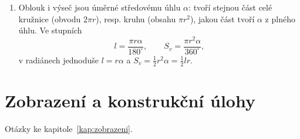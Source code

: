 \begin{enumerate}[label=\textbf{\arabic*.}, leftmargin=*, itemsep=0.8em]
  \item {}
  Oblouk i výseč jsou úměrné středovému úhlu $\alpha$: tvoří stejnou část celé kružnice (obvodu $2\pi r$), resp. kruhu (obsahu $\pi r^2$), jakou část tvoří $\alpha$ z plného úhlu. Ve stupních
  \begin{equation*}
    l = \frac{\pi r\alpha}{180^\circ}, \qquad S_v = \frac{\pi r^2\alpha}{360^\circ},
  \end{equation*}
  v radiánech jednoduše $l = r\alpha$ a $S_v = \frac{1}{2}r^2\alpha = \frac{1}{2}lr$. 
\end{enumerate}

\section{Zobrazení a konstrukční úlohy}

Otázky ke kapitole~\ref{kap:zobrazeni}.

